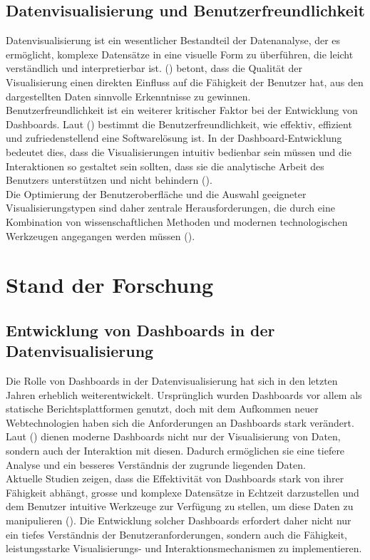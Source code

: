 \documentclass[a4paper, 12pt]{scrartcl}
\begin{document}
\subsection{Datenvisualisierung und Benutzerfreundlichkeit}
Datenvisualisierung ist ein wesentlicher Bestandteil der Datenanalyse, der es ermöglicht, komplexe Datensätze in eine visuelle Form zu überführen, die leicht verständlich und interpretierbar ist. (\cite[S.119]{Dibia2023}) betont, dass die Qualität der Visualisierung einen direkten Einfluss auf die Fähigkeit der Benutzer hat, aus den dargestellten Daten sinnvolle Erkenntnisse zu gewinnen.\\[1em]Benutzerfreundlichkeit ist ein weiterer kritischer Faktor bei der Entwicklung von Dashboards. Laut (\cite[S.119]{Dibia2023}) bestimmt die Benutzerfreundlichkeit, wie effektiv, effizient und zufriedenstellend eine Softwarelösung ist. In der Dashboard-Entwicklung bedeutet dies, dass die Visualisierungen intuitiv bedienbar sein müssen und die Interaktionen so gestaltet sein sollten, dass sie die analytische Arbeit des Benutzers unterstützen und nicht behindern (\cite[S.119]{Dibia2023}).\\[1em]Die Optimierung der Benutzeroberfläche und die Auswahl geeigneter Visualisierungstypen sind daher zentrale Herausforderungen, die durch eine Kombination von wissenschaftlichen Methoden und modernen technologischen Werkzeugen angegangen werden müssen (\cite[S.119]{Dibia2023}).
\newpage
	\section{Stand der Forschung}
	\label{sec:standDerForschung}

\subsection{Entwicklung von Dashboards in der Datenvisualisierung}
Die Rolle von Dashboards in der Datenvisualisierung hat sich in den letzten Jahren erheblich weiterentwickelt. Ursprünglich wurden Dashboards vor allem als statische Berichtsplattformen genutzt, doch mit dem Aufkommen neuer Webtechnologien haben sich die Anforderungen an Dashboards stark verändert. Laut (\cite[S.119]{Dibia2023}) dienen moderne Dashboards nicht nur der Visualisierung von Daten, sondern auch der Interaktion mit diesen. Dadurch ermöglichen sie eine tiefere Analyse und ein besseres Verständnis der zugrunde liegenden Daten.\\[1em] Aktuelle Studien zeigen, dass die Effektivität von Dashboards stark von ihrer Fähigkeit abhängt, grosse und komplexe Datensätze in Echtzeit darzustellen und dem Benutzer intuitive Werkzeuge zur Verfügung zu stellen, um diese Daten zu manipulieren (\cite[S.119]{Dibia2023}). Die Entwicklung solcher Dashboards erfordert daher nicht nur ein tiefes Verständnis der Benutzeranforderungen, sondern auch die Fähigkeit, leistungsstarke Visualisierungs- und Interaktionsmechanismen zu implementieren.
\end{document}
